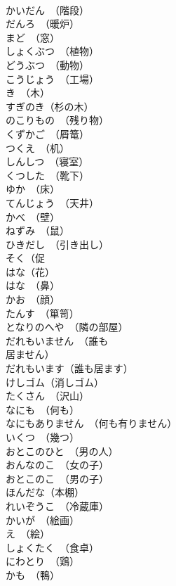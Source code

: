 \documentclass[8pt]{extreport}
\begin{document}
\begin{CJK}{UTF8}{min}
\\	かいだん　（階段）	
\\	だんろ　（暖炉）	
\\	まど　（窓）	
\\	しょくぶつ　（植物）	
\\	どうぶつ　（動物）	
\\	こうじょう　（工場）	
\\	き　（木）	
\\	すぎのき（杉の木）	
\\	のこりもの　（残り物）	
\\	くずかご　（屑篭）	
\\	つくえ　（机）	
\\	しんしつ　（寝室）	
\\	くつした　（靴下）	
\\	ゆか　（床）	
\\	てんじょう　（天井）	
\\	かべ　（壁）	
\\	ねずみ　（鼠）	
\\	ひきだし　（引き出し）	
\\	そく（促
\\	はな（花）	
\\	はな　（鼻）	
\\	かお　（顔）	
\\	たんす　（箪笥）	
\\	となりのへや　（隣の部屋）	
\\	だれもいません　（誰も
\\	居ません）	
\\	だれもいます（誰も居ます）	
\\	けしゴム（消しゴム）	
\\	たくさん　（沢山）	
\\	なにも　（何も）	
\\	なにもありません　（何も有りません）	
\\	いくつ　（幾つ）	
\\	おとこのひと　（男の人）	
\\	おんなのこ　（女の子）	
\\	おとこのこ　（男の子）	
\\	ほんだな（本棚）	
\\	れいぞうこ　（冷蔵庫）	
\\	かいが　（絵画）	
\\	え　（絵）	
\\	しょくたく　（食卓）	
\\	にわとり　（鶏）	
\\	かも　（鴨）	

\end{CJK}
\end{document}
